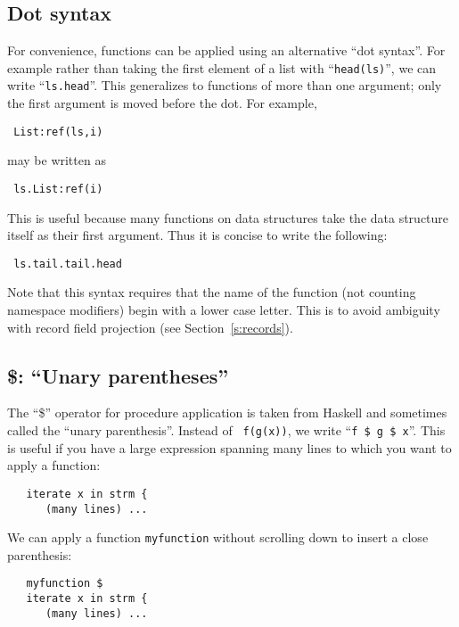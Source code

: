 \documentclass[twocolumn]{report}
\newcommand{\cde}{\tt}
\newenvironment{wscode}{\begin{center}\tt}{\end{center}}
\begin{document}
\subsection{Dot syntax}
  For convenience, functions can be applied using an
alternative ``dot syntax''.  For example rather than taking the first
element of a list with ``{\cde head(ls)}'', we can write ``{\cde ls.head}''.
This generalizes to functions of more than one argument; only the
first argument is moved before the dot.  For example, 
\vspace{-2mm}
\begin{wscode}
List:ref(ls,i)
\end{wscode}
\vspace{-2mm}
 may be written as 
\vspace{-2mm}
\begin{wscode}
ls.List:ref(i)
\end{wscode}
\vspace{-2mm}
This is useful because many functions on data structures take the
data structure itself as their first argument.  Thus it is concise to
write the following:
\vspace{-2mm}
\begin{wscode}
ls.tail.tail.head
\end{wscode}
\vspace{-2mm}
Note that this syntax requires that the name of the function (not
counting namespace modifiers) begin with a lower case letter.  This is
to avoid ambiguity with record field projection (see Section~\ref{s:records}).

\subsection{\$: ``Unary parentheses''}

The ``\$'' operator for procedure application is taken from Haskell
and sometimes called the ``unary parenthesis''.  Instead of {\cde
  f(g(x))}, we write ``{\cde f \$ g \$ x}''.
This is useful if you have a large expression spanning many lines to
which you want to apply a function:
\begin{verbatim}
   iterate x in strm { 
      (many lines) ... 
\end{verbatim}
We can apply a function {\cde myfunction} without scrolling down to
insert a close parenthesis:
\begin{verbatim}
   myfunction $
   iterate x in strm { 
      (many lines) ... 
\end{verbatim}
\end{document}
